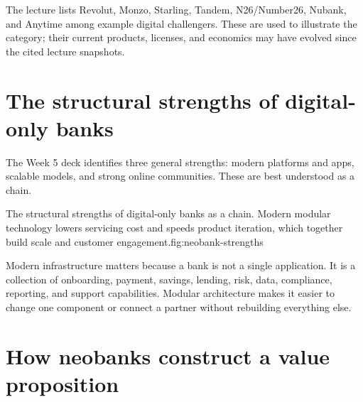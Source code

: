 The lecture lists Revolut, Monzo, Starling, Tandem, N26/Number26, Nubank, and Anytime among example digital challengers. These are used to illustrate the category; their current products, licenses, and economics may have evolved since the cited lecture snapshots.

\section{The structural strengths of digital-only banks}

The Week 5 deck identifies three general strengths: modern platforms and apps, scalable models, and strong online communities. These are best understood as a chain.

\begin{utpfig}{The structural strengths of digital-only banks as a chain. Modern modular technology lowers servicing cost and speeds product iteration, which together build scale and customer engagement.}{fig:neobank-strengths}
\end{utpfig}

Modern infrastructure matters because a bank is not a single application. It is a collection of onboarding, payment, savings, lending, risk, data, compliance, reporting, and support capabilities. Modular architecture makes it easier to change one component or connect a partner without rebuilding everything else.

\section{How neobanks construct a value proposition}

